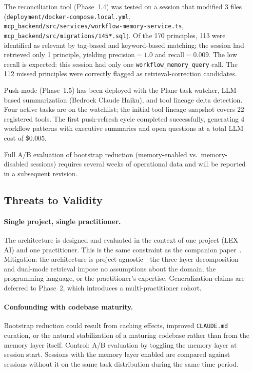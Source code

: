 \documentclass[11pt]{article}
\begin{document}
The reconciliation tool (Phase~1.4) was tested on a session that modified 3 files (\texttt{deployment/docker-compose.local.yml}, \texttt{mcp\_backend/src/services/workflow-memory-service.ts}, \texttt{mcp\_backend/src/migrations/145*.sql}).
Of the 170 principles, 113 were identified as relevant by tag-based and keyword-based matching; the session had retrieved only 1 principle, yielding precision${}=1.0$ and recall${}=0.009$.
The low recall is expected: this session had only one \texttt{workflow\_memory\_query} call.
The 112 missed principles were correctly flagged as retrieval-correction candidates.

Push-mode (Phase~1.5) has been deployed with the Plane task watcher, LLM-based summarization (Bedrock Claude Haiku), and tool lineage delta detection.
Four active tasks are on the watchlist; the initial tool lineage snapshot covers 22 registered tools.
The first push-refresh cycle completed successfully, generating 4 workflow patterns with executive summaries and open questions at a total LLM cost of \$0.005.

Full A/B evaluation of bootstrap reduction (memory-enabled vs.\ memory-disabled sessions) requires several weeks of operational data and will be reported in a subsequent revision.

\subsection{Threats to Validity}
\label{sec:threats}

\paragraph{Single project, single practitioner.}
The architecture is designed and evaluated in the context of one project (LEX AI) and one practitioner.
This is the same constraint as the companion paper~\citep[\S8]{ovcharov2026recursive}.
Mitigation: the architecture is project-agnostic---the three-layer decomposition and dual-mode retrieval impose no assumptions about the domain, the programming language, or the practitioner's expertise.
Generalization claims are deferred to Phase~2, which introduces a multi-practitioner cohort.

\paragraph{Confounding with codebase maturity.}
Bootstrap reduction could result from caching effects, improved \texttt{CLAUDE.md} curation, or the natural stabilization of a maturing codebase rather than from the memory layer itself.
Control: A/B evaluation by toggling the memory layer at session start.
Sessions with the memory layer enabled are compared against sessions without it on the same task distribution during the same time period.
\end{document}
